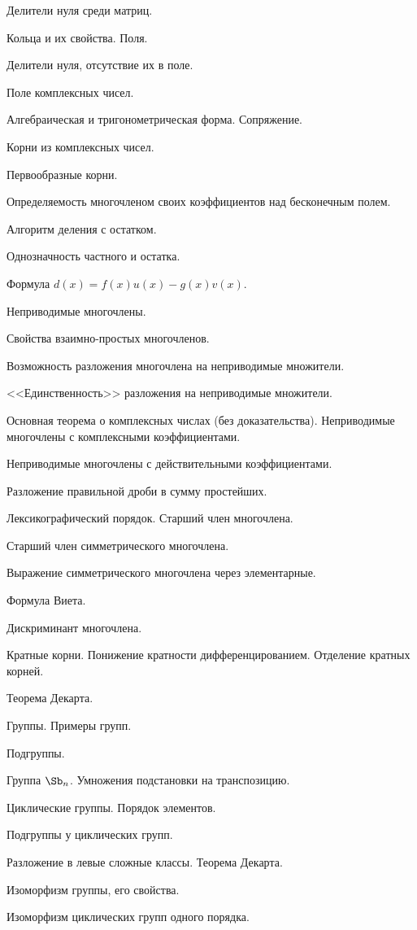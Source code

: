 \documentclass[a4paper]{article}
\begin{document}
\begin{nums}{-1}
\item  Делители нуля среди матриц.
\item  Кольца и их свойства. Поля.
\item  Делители нуля, отсутствие их в поле.
\item  Поле комплексных чисел.
\item  Алгебраическая и тригонометрическая форма. Сопряжение.
\item  Корни из комплексных чисел.
\item  Первообразные корни.
\item  Определяемость многочленом своих коэффициентов над бесконечным полем.
\item  Алгоритм деления с остатком.
\item  Однозначность частного и остатка.
\item  Формула $d(x) = f(x)u(x) - g(x)v(x)$.
\item  Неприводимые многочлены.
\item  Свойства взаимно-простых многочленов.
\item  Возможность разложения многочлена на неприводимые множители.
\item  <<Единственность>> разложения на неприводимые множители.
\item  Основная теорема о комплексных числах (без доказательства). Неприводимые многочлены с комплексными коэффициентами.
\item  Неприводимые многочлены с действительными коэффициентами.
\item  Разложение правильной дроби в сумму простейших.
\item  Лексикографический порядок. Старший член многочлена.
\item  Старший член симметрического многочлена.
\item  Выражение симметрического многочлена через элементарные.
\item  Формула Виета.
\item  Дискриминант многочлена.
\item  Кратные корни. Понижение кратности дифференцированием. Отделение кратных корней.
\item  Теорема Декарта.
\item  Группы. Примеры групп.
\item  Подгруппы.
\item  Группа $\Sb_n$. Умножения подстановки на транспозицию.
\item  Циклические группы. Порядок элементов.
\item  Подгруппы у циклических групп.
\item  Разложение в левые сложные классы. Теорема Декарта.
\item  Изоморфизм группы, его свойства.
\item  Изоморфизм циклических групп одного порядка.
\end{nums}

\medskip\dmvntrail
\end{document}
